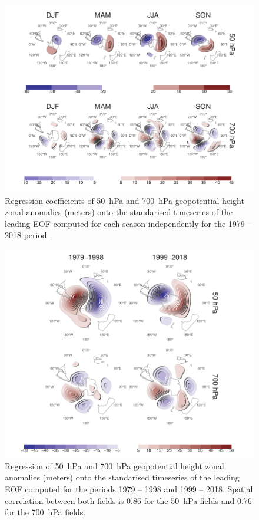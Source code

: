 \documentclass[smallextended]{svjour3}       %
\begin{document}
\begin{figure}
\includegraphics{A5-1} \caption{Regression coefficients of 50~hPa and 700~hPa geopotential height zonal anomalies (meters) onto the standarised timeseries of the leading EOF computed for each season independently for the 1979 -- 2018 period.}\label{fig:A5}
\end{figure}

\begin{figure}
\includegraphics{A6-1} \caption{Regression of 50~hPa and 700~hPa geopotential height zonal anomalies (meters) onto the standarised timeseries of the leading EOF computed for the periods 1979 -- 1998 and 1999 -- 2018. Spatial correlation between both fields is 0.86 for the 50~hPa fields and 0.76 for the 700~hPa fields.}\label{fig:A6}
\end{figure}
\end{document}
